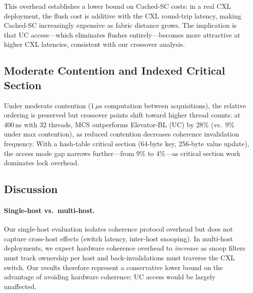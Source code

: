 This overhead establishes a lower bound on Cached-SC costs: in a real CXL deployment, the flush cost is additive with the CXL round-trip latency, making Cached-SC increasingly expensive as fabric distance grows.
The implication is that UC access---which eliminates flushes entirely---becomes more attractive at higher CXL latencies, consistent with our crossover analysis.

\subsection{Moderate Contention and Indexed Critical Section}

Under moderate contention (1\,$\mu$s computation between acquisitions), the relative ordering is preserved but crossover points shift toward higher thread counts: at 400\,ns with 32 threads, MCS outperforms Elevator-BL (UC) by 28\% (vs.\ 9\% under max contention), as reduced contention decreases coherence invalidation frequency.
With a hash-table critical section (64-byte key, 256-byte value update), the access mode gap narrows further---from 9\% to 4\%---as critical section work dominates lock overhead.

\subsection{Discussion}
\label{sec:discussion}

\paragraph{Single-host vs.\ multi-host.}
Our single-host evaluation isolates coherence protocol overhead but does not capture cross-host effects (switch latency, inter-host snooping).
In multi-host deployments, we expect hardware coherence overhead to \emph{increase} as snoop filters must track ownership per host and back-invalidations must traverse the CXL switch.
Our results therefore represent a conservative lower bound on the advantage of avoiding hardware coherence; UC access would be largely unaffected.

